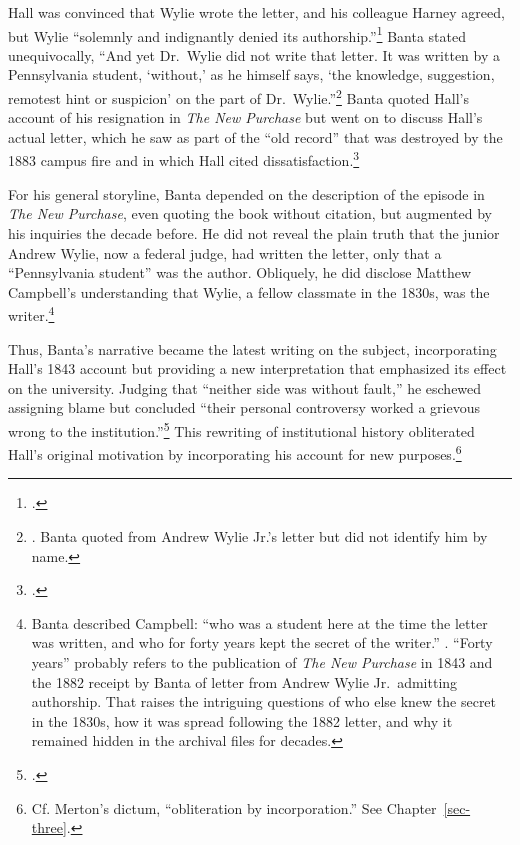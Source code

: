 \documentclass[
  american,
  letterpaper,
]{scrreprt}
\begin{document}
Hall was convinced that Wylie wrote the letter, and his colleague Harney
agreed, but Wylie ``solemnly and indignantly denied its
authorship.''\footnote{.}
Banta stated unequivocally, ``And yet Dr.~Wylie did not write that
letter. It was written by a Pennsylvania student, `without,' as he
himself says, `the knowledge, suggestion, remotest hint or suspicion' on
the part of Dr.~Wylie.''\footnote{. Banta quoted from Andrew Wylie Jr.'s letter but did not identify
  him by name.} Banta quoted Hall's account of his resignation in
\emph{The New Purchase} but went on to discuss Hall's actual letter,
which he saw as part of the ``old record'' that was destroyed by the
1883 campus fire and in which Hall cited dissatisfaction.\footnote{.}

For his general storyline, Banta depended on the description of the
episode in \emph{The New Purchase}, even quoting the book without
citation, but augmented by his inquiries the decade before. He did not
reveal the plain truth that the junior Andrew Wylie, now a federal
judge, had written the letter, only that a ``Pennsylvania student'' was
the author. Obliquely, he did disclose Matthew Campbell's understanding
that Wylie, a fellow classmate in the 1830s, was the writer.\footnote{Banta
  described Campbell: ``who was a student here at the time the letter
  was written, and who for forty years kept the secret of the writer.''
  . ``Forty years'' probably
  refers to the publication of \emph{The New Purchase} in 1843 and the
  1882 receipt by Banta of letter from Andrew Wylie Jr.~admitting
  authorship. That raises the intriguing questions of who else knew the
  secret in the 1830s, how it was spread following the 1882 letter, and
  why it remained hidden in the archival files for decades.}

Thus, Banta's narrative became the latest writing on the subject,
incorporating Hall's 1843 account but providing a new interpretation
that emphasized its effect on the university. Judging that ``neither
side was without fault,'' he eschewed assigning blame but concluded
``their personal controversy worked a grievous wrong to the
institution.''\footnote{.}
This rewriting of institutional history obliterated Hall's original
motivation by incorporating his account for new purposes.\footnote{Cf.
  Merton's dictum, ``obliteration by incorporation.'' See
  Chapter~\ref{sec-three}.}
\end{document}
